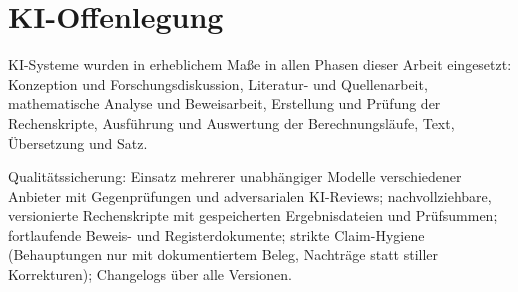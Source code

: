 %
%
%   

\section*{KI-Offenlegung}

\noindent
KI-Systeme wurden in erheblichem Ma\ss{}e in allen Phasen dieser Arbeit
eingesetzt: Konzeption und Forschungsdiskussion, Literatur- und
Quellenarbeit, mathematische Analyse und Beweisarbeit, Erstellung und
Pr\"ufung der Rechenskripte, Ausf\"uhrung und Auswertung der
Berechnungsl\"aufe, Text, \"Ubersetzung und Satz.

\medskip

\noindent
Qualit\"atssicherung: Einsatz mehrerer unabh\"angiger Modelle
verschiedener Anbieter mit Gegenpr\"ufungen und adversarialen KI-Reviews;
nachvollziehbare, versionierte Rechenskripte mit gespeicherten
Ergebnisdateien und Pr\"ufsummen; fortlaufende Beweis- und
Registerdokumente; strikte Claim-Hygiene (Behauptungen nur mit
dokumentiertem Beleg, Nachtr\"age statt stiller Korrekturen); Changelogs
\"uber alle Versionen.
